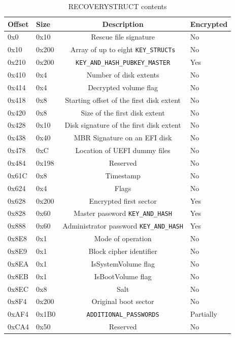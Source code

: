 \documentclass[thesis=B,english]{FITthesis}[2012/10/20]
\begin{document}
	\begin{table}
		\centering
		\begin{tabular}{| l | l | c | l |} 
			\hline
			Offset & Size & Description & Encrypted \\
			\hline \hline
			0x0  & 0x10  & Rescue file signature & No	\\
			\hline
			0x10 & 0x200 & Array of up to eight \verb|KEY_STRUCTs| & No\\ 
			\hline
			0x210 & 0x200 &  \verb|KEY_AND_HASH_PUBKEY_MASTER| & Yes\\ 
			\hline
			0x410 & 0x4 &  Number of disk extents & No\\ 
			\hline
			0x414 & 0x4 &  Decrypted volume flag & No\\ 
			\hline
			0x418 & 0x8 &  Starting offset of the first disk extent & No\\ 
			\hline
			0x420 & 0x8 &  Size of the first disk extent & No\\ 
			\hline
			0x428 & 0x10 & Disk signature of the first disk extent & No\\ 
			\hline
			0x438 & 0x40 & MBR Signature on an EFI disk & No \\ 
			\hline
			0x478 & 0xC & Location of UEFI dummy files  & No\\ 
			\hline
			0x484 & 0x198 & Reserved  & No\\ 
			\hline
			0x61C & 0x8 & Timestamp  & No\\ 
			\hline
			0x624 & 0x4 & Flags  & No\\ 
			\hline
			0x628 & 0x200 & Encrypted first sector & Yes \\ 
			\hline
			0x828 & 0x60 & Master password \verb|KEY_AND_HASH| & Yes \\ 
			\hline
			0x888 & 0x60 & Administrator password \verb|KEY_AND_HASH| & Yes  \\ 
			\hline
			0x8E8 & 0x1 & Mode of operation & No \\ 
			\hline
			0x8E9 & 0x1 & Block cipher identifier & No \\ 
			\hline
			0x8EA & 0x1 & IsSystemVolume flag & No  \\ 
			\hline
			0x8EB & 0x1 & IsBootVolume flag & No   \\ 
			\hline
			0x8EC & 0x8 & Salt & No   \\ 
			\hline
			0x8F4 & 0x200 & Original boot sector & No   \\ 
			\hline
			0xAF4 & 0x1B0 & \verb|ADDITIONAL_PASSWORDS|  & Partially  \\ 
			\hline
			0xCA4 & 0x50 & Reserved & No \\ 
			\hline
			
		\end{tabular}
		\caption{RECOVERY\TextUnderscore{}STRUCT contents}
		\label{tab:recstruct}
	\end{table}
	
\end{document}
